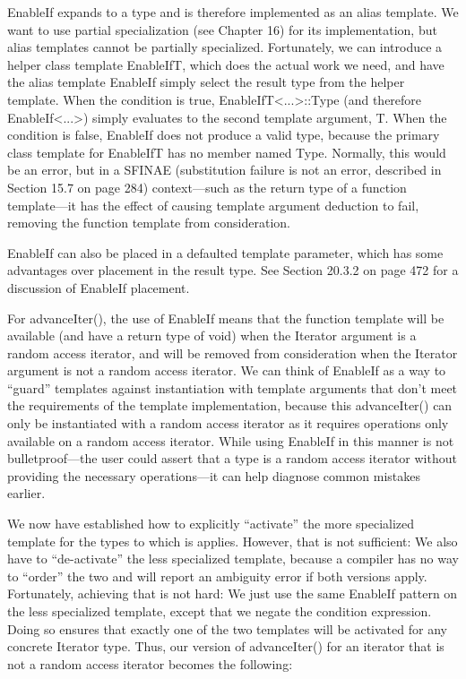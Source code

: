 EnableIf expands to a type and is therefore implemented as an alias template. We want to use partial specialization (see Chapter 16) for its implementation, but alias templates cannot be partially specialized. Fortunately, we can introduce a helper class template EnableIfT, which does the actual work we need, and have the alias template EnableIf simply select the result type from the helper template. When the condition is true, EnableIfT<...>::Type (and therefore EnableIf<...>) simply evaluates to the second template argument, T. When the condition is false, EnableIf does not produce a valid type, because the primary class template for EnableIfT has no member named Type. Normally, this would be an error, but in a SFINAE (substitution failure is not an error, described in Section 15.7 on page 284) context—such as the return type of a function template—it has the effect of causing template argument deduction to fail, removing the function template from consideration.

\begin{tcolorbox}[colback=webgreen!5!white,colframe=webgreen!75!black]
\hspace*{0.75cm}EnableIf can also be placed in a defaulted template parameter, which has some advantages over placement in the result type. See Section 20.3.2 on page 472 for a discussion of EnableIf placement.
\end{tcolorbox}

For advanceIter(), the use of EnableIf means that the function template will be available (and have a return type of void) when the Iterator argument is a random access iterator, and will be removed from consideration when the Iterator argument is not a random access iterator. We can think of EnableIf as a way to “guard” templates against instantiation with template arguments that don’t meet the requirements of the template implementation, because this advanceIter() can only be instantiated with a random access iterator as it requires operations only available on a random access iterator. While using EnableIf in this manner is not bulletproof—the user could assert that a type is a random access iterator without providing the necessary operations—it can help diagnose common mistakes earlier.

We now have established how to explicitly “activate” the more specialized template for the types to which is applies. However, that is not sufficient: We also have to “de-activate” the less specialized template, because a compiler has no way to “order” the two and  will report an ambiguity error if both versions apply. Fortunately, achieving that is not hard: We just use the same EnableIf pattern on the less specialized template, except that we negate the condition expression. Doing so ensures that exactly one of the two templates will be activated for any concrete Iterator type. Thus, our version of advanceIter() for an iterator that is not a random access iterator becomes the following:

